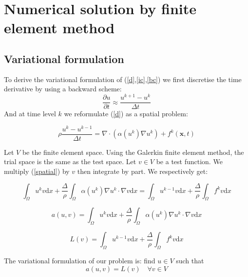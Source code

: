 \documentclass[10pt,a4paper]{report}
\begin{document}
\section{Numerical solution by finite element method}
\subsection{Variational formulation}
To derive the variational formulation of (\ref{d},\ref{ic},\ref{bc}) we first discretise the time derivative by using a backward scheme:
\begin{equation}\label{derive}
\frac{\partial u}{\partial t} \approx \frac{u^{k+1}-u^{k}}{\Delta t}
\end{equation}
And at time level $k$ we reformulate (\ref{d}) as a spatial problem:

\begin{equation}\label{spatial}
\rho\frac{u^{k}-u^{k-1}}{\Delta t} = \nabla\cdot(\alpha (u^{k})\nabla u^{k}) + f^{k}(\textbf{x},t)
\end{equation}



Let $V$ be the finite element space. Using the Galerkin finite element method, the trial space is the same as the test space. Let $v\in V$ be a test function. We multiply (\ref{spatial}) by $v$ then integrate by part. We respectively get:


\begin{equation}
\int_{\Omega} u^{k} v\mathrm{d}x + \frac{\Delta}{\rho}\int_{\Omega} \alpha(u^{k})\nabla u^{k}\cdot\nabla v\mathrm{d}x=\int_{\Omega} u^{k-1} v\mathrm{d}x +\frac{\Delta}{\rho}\int_{\Omega}f^{k} v\mathrm{d}x 
\end{equation}


\begin{equation}
a(u,v) = \int_{\Omega} u^{k} v\mathrm{d}x + \frac{\Delta}{\rho}\int_{\Omega} \alpha(u^{k})\nabla u^{k}\cdot\nabla v\mathrm{d}x \nonumber
\end{equation}

\begin{equation}
L(v) = \int_{\Omega} u^{k-1} v\mathrm{d}x +\frac{\Delta}{\rho}\int_{\Omega}f^{k} v\mathrm{d}x  \nonumber
\end{equation}

The variational formulation of our problem is: find $u\in V$ such that 
\begin{equation} \nonumber
a(u,v) = L(v) \quad\forall v\in V
\end{equation}
\end{document}
